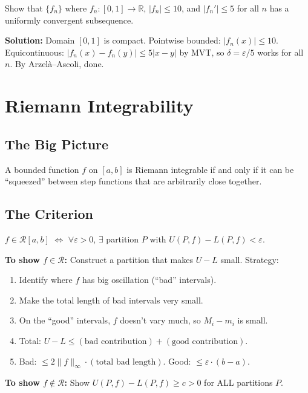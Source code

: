 \documentclass[11pt]{article}
\newcommand{\R}{\mathbb{R}}
\newcommand{\eps}{\varepsilon}
\theoremstyle{definition}
\begin{document}
\begin{example}
Show that $\{f_n\}$ where $f_n: [0,1] \to \R$, $|f_n| \leq 10$, and $|f_n'| \leq 5$ for all $n$ has a uniformly convergent subsequence.

\textbf{Solution:} Domain $[0,1]$ is compact. Pointwise bounded: $|f_n(x)| \leq 10$. Equicontinuous: $|f_n(x) - f_n(y)| \leq 5|x - y|$ by MVT, so $\delta = \eps/5$ works for all $n$. By Arzel\`a--Ascoli, done.
\end{example}

\section{Riemann Integrability}

\subsection{The Big Picture}

A bounded function $f$ on $[a,b]$ is Riemann integrable if and only if it can be ``squeezed'' between step functions that are arbitrarily close together.

\subsection{The Criterion}

$f \in \mathscr{R}[a,b]$ $\Leftrightarrow$ $\forall \eps > 0$, $\exists$ partition $P$ with $U(P,f) - L(P,f) < \eps$.

\begin{application}
\textbf{To show $f \in \mathscr{R}$:} Construct a partition that makes $U - L$ small. Strategy:
\begin{enumerate}
\item Identify where $f$ has big oscillation (``bad'' intervals).
\item Make the total length of bad intervals very small.
\item On the ``good'' intervals, $f$ doesn't vary much, so $M_i - m_i$ is small.
\item Total: $U - L \leq (\text{bad contribution}) + (\text{good contribution})$.
\item Bad: $\leq 2\|f\|_\infty \cdot (\text{total bad length})$. Good: $\leq \eps \cdot (b-a)$.
\end{enumerate}

\textbf{To show $f \notin \mathscr{R}$:} Show $U(P,f) - L(P,f) \geq c > 0$ for ALL partitions $P$.
\end{application}
\end{document}
